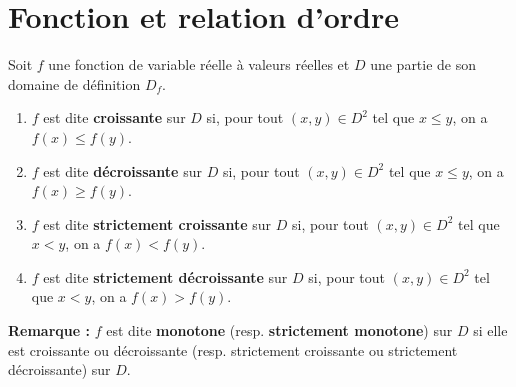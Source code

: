 \section{Fonction et relation d'ordre}
\begin{defi}[Monotonie]
    Soit \(f\) une fonction de variable réelle à valeurs réelles et \(D\) une partie de son domaine de définition \(D_f\).
    \begin{enumerate}
        \item \(f\) est dite \textbf{croissante} sur \(D\) si, pour tout \((x, y) \in D^2\) tel que \(x \leq y\), on a \(f(x) \leq f(y)\).
        \item \(f\) est dite \textbf{décroissante} sur \(D\) si, pour tout \((x, y) \in D^2\) tel que \(x \leq y\), on a \(f(x) \geq f(y)\).
        \item \(f\) est dite \textbf{strictement croissante} sur \(D\) si, pour tout \((x, y) \in D^2\) tel que \(x < y\), on a \(f(x) < f(y)\).
        \item \(f\) est dite \textbf{strictement décroissante} sur \(D\) si, pour tout \((x, y) \in D^2\) tel que \(x < y\), on a \(f(x) > f(y)\).
    \end{enumerate}
    \textbf{Remarque :} \(f\) est dite \textbf{monotone} (resp. \textbf{strictement monotone}) sur \(D\) si elle est croissante ou décroissante (resp. strictement croissante ou strictement décroissante) sur \(D\).
\end{defi}

